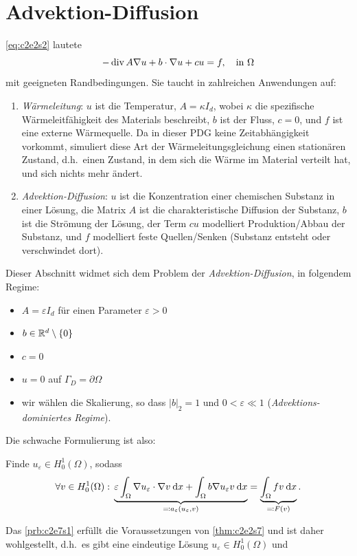 \documentclass[../skript.tex]{subfiles}
\begin{document}
\section{Advektion-Diffusion}\label{sec:c2e7}
\cref{eq:c2e2s2} lautete
\[
	-\operatorname{div} A \nabla u + b\cdot\nabla u + c u = f,\quad \text{in }\Omega
\]
mit geeigneten Randbedingungen. Sie taucht in zahlreichen Anwendungen auf:
\begin{enumerate}
	\item \emph{Wärmeleitung}: $u$ ist die Temperatur, $A=\kappa I_d$, wobei $\kappa$ die spezifische Wärmeleitfähigkeit des Materials beschreibt, $b$ ist der Fluss, $c=0$, und $f$ ist eine externe Wärmequelle. Da in dieser PDG keine Zeitabhängigkeit vorkommt, simuliert diese Art der Wärmeleitungsgleichung einen stationären Zustand, d.h.\ einen Zustand, in dem sich die Wärme im Material verteilt hat, und sich nichts mehr ändert. 
	\item \emph{Advektion-Diffusion}: $u$ ist die Konzentration einer chemischen Substanz in einer Lösung, die Matrix $A$ ist die charakteristische Diffusion der Substanz, $b$ ist die Strömung der Lösung, der Term $cu$ modelliert Produktion\slash{}Abbau der Substanz, und $f$ modelliert feste Quellen\slash{}Senken (Substanz entsteht oder verschwindet dort).
\end{enumerate}
Dieser Abschnitt widmet sich dem Problem der \emph{Advektion-Diffusion}, in folgendem Regime:
\begin{itemize}
	\item $A = \varepsilon I_d$ für einen Parameter $\varepsilon > 0$
	\item $b\in\mathbb{R}^d\setminus\{0\}$
	\item $c=0$
	\item $u=0$ auf $\Gamma_D = \partial\Omega$
	\item wir wählen die Skalierung, so dass $|b|_2=1$ und $0<\varepsilon \ll 1$ (\emph{Advektions-dominiertes Regime}).
\end{itemize}
Die schwache Formulierung ist also: 
\begin{problem}\label{prb:c2e7s1}
Finde $u_\varepsilon\in H^1_0(\Omega)$, sodass
\[ 
	\forall v\in H^1_0(\Omega):\, \underbrace{ \varepsilon \int_\Omega\nabla u_\varepsilon\cdot\nabla v\:\mathrm{d}x + \int_\Omega b\nabla u_\varepsilon v\:\mathrm{d}x }_{\eqqcolon a_\varepsilon(u_\varepsilon,v)} = \underbrace{ \int_\Omega fv\:\mathrm{d}x }_{\eqqcolon F(v)}.
\]
\end{problem}
Das \cref{prb:c2e7s1} erfüllt die Voraussetzungen von \cref{thm:c2e2s7} und ist daher wohlgestellt, d.h.\ es gibt eine eindeutige Lösung $u_\varepsilon\in H^1_0(\Omega)$ und 
\end{document}
